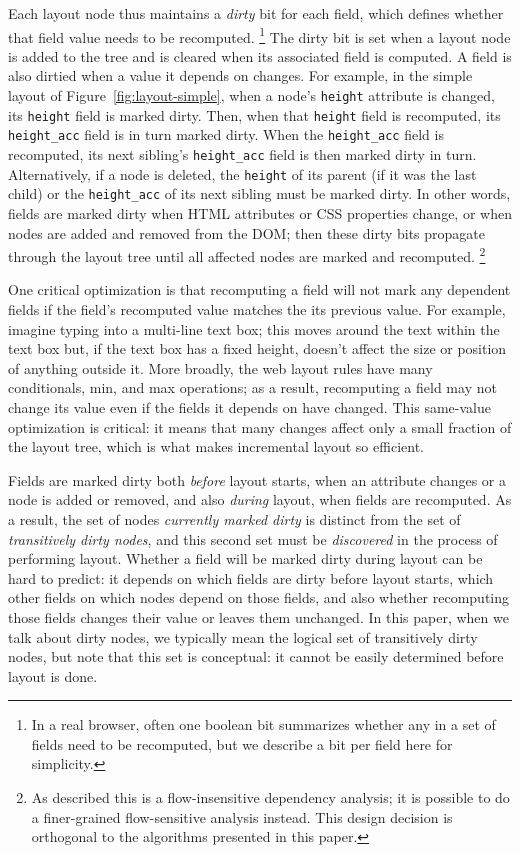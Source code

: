 Each layout node thus maintains
  a \textit{dirty} bit for each field,
  which defines whether that field value needs to be recomputed.%
\footnote{In a real browser, often one boolean bit
  summarizes whether any in a set of fields need to be recomputed,
  but we describe a bit per field here for simplicity.}
The dirty bit is set when a layout node is added to the tree
  and is cleared when its associated field is computed.
A field is also dirtied when a value it depends on changes.
For example, in the simple layout of Figure~\ref{fig:layout-simple},
  when a node's \texttt{height} attribute is changed,
  its \texttt{height} field is marked dirty.
Then, when that \texttt{height} field is recomputed,
  its \texttt{height\_acc} field is in turn marked dirty.
When the \texttt{height\_acc} field is recomputed,
  its next sibling's \texttt{height\_acc} field
  is then marked dirty in turn.
Alternatively, if a node is deleted,
  the \texttt{height} of its parent
  (if it was the last child)
  or the \texttt{height\_acc} of its next sibling
  must be marked dirty.
In other words, fields are marked dirty when
  HTML attributes or CSS properties change,
  or when nodes are added and removed from the DOM;
  then these dirty bits propagate through the layout tree
  until all affected nodes are marked and recomputed.%
\footnote{
  As described this is a flow-insensitive dependency analysis;
    it is possible to do a finer-grained flow-sensitive analysis instead.
  This design decision is orthogonal to the algorithms presented in this paper.
}

One critical optimization is that
  recomputing a field will not mark any dependent fields
  if the field's recomputed value
  matches the its previous value.
For example, imagine typing into a multi-line text box;
  this moves around the text within the text box
  but, if the text box has a fixed height,
  doesn't affect the size or position of anything outside it.
More broadly, the web layout rules have many
  conditionals, \textsf{min}, and \textsf{max} operations;
  as a result, recomputing a field may not change its value
  even if the fields it depends on have changed.
This same-value optimization is critical:
  it means that many changes affect only a
  small fraction of the layout tree,
  which is what makes incremental layout so efficient.

Fields are marked dirty both \emph{before} layout starts,
  when an attribute changes or a node is added or removed,
  and also \emph{during} layout, when fields are recomputed.
As a result,
  the set of nodes \emph{currently marked dirty}
  is distinct from the set of \emph{transitively dirty nodes},
  and this second set must be \emph{discovered}
  in the process of performing layout.
Whether a field will be marked dirty during layout
  can be hard to predict:
  it depends on which fields are dirty before layout starts,
  which other fields on which nodes depend on those fields,
  and also whether recomputing those fields
  changes their value or leaves them unchanged.
In this paper, when we talk about dirty nodes,
  we typically mean the logical set of transitively dirty nodes,
  but note that this set is conceptual:
  it cannot be easily determined before layout is done.

